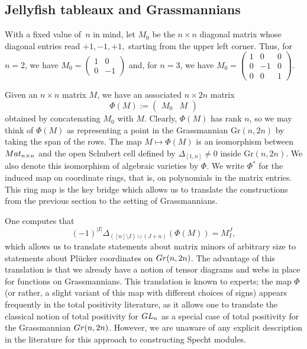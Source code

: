 \documentclass[10pt]{amsart}
\theoremstyle{definition}
\theoremstyle{plain}
\theoremstyle{plain}
\theoremstyle{definition}
\theoremstyle{remark}
\theoremstyle{plain}
\theoremstyle{plain}
\theoremstyle{plain}
\numberwithin{equation}{section}
\newcommand{\Gr}{\mathrm{Gr}}
\begin{document}
\subsection{Jellyfish tableaux and Grassmannians}\label{sec:jellyfish_on_Gr}
With a fixed value of~$n$ in mind, let 
$M_0$ be the $n \times n$ diagonal matrix whose diagonal entries read $+1,-1,+1,$ starting from the upper left corner. Thus, for $n=2$, we have $M_0 = \begin{pmatrix}
1 & 0 \\ 0 & -1
\end{pmatrix}$
and, for $n=3$, we have
$M_0 = \begin{pmatrix}
1 &  0 & 0 \\ 0 & -1 & 0 \\ 0 & 0 & 1
\end{pmatrix}$.

 
Given an $n \times n$ matrix $M$, we have an associated $n \times 2n $ matrix 
\begin{equation}\label{eq:Phi}
\Phi(M) := \begin{pmatrix}
M_0 & {M} 
\end{pmatrix}
\end{equation}
obtained by concatenating $M_0$ with $M$.
Clearly, $\Phi(M)$ has rank $n$, so we may think of $\Phi(M)$ as representing a point in the Grassmannian $\Gr(n,2n)$ by taking the span of the rows. The map $M \mapsto \Phi(M)$ is an isomorphism between ${\rm Mat}_{n \times n}$ and the open Schubert cell defined by $\Delta_{[1,n]} \neq 0$ inside 
$\Gr(n,2n)$. We also denote this isomorphism of algebraic varieties by $\Phi$. We write $\Phi^*$ for the induced map on coordinate rings, that is, on polynomials in the matrix entries. This ring map is the key bridge which allows us to translate the constructions from the previous section to the setting of Grassmannians.

 
One computes that
\begin{equation}\label{eq:PlutoMinor}
(-1)^{|I|}\Delta_{([n]\setminus I) \cup (J+n)}(\Phi(M)) = M_I^J,
\end{equation}
which allows us to translate statements about matrix minors of arbitrary size to statements about Pl\"ucker coordinates on ${\rm Gr}(n,2n)$. The advantage of this translation is that we already have a notion of tensor diagrams and webs in place for functions on Grassmannians. This translation is known to experts; the map $\Phi$ (or rather, a slight variant of this map with different choices of signs) appears frequently in the total positivity literature, as it allows one to translate the classical notion of total positivity for ${\rm GL}_n$ as a special case of total positivity for the Grassmannian ${\rm Gr}(n,2n)$. However, we are unaware of any explicit description in the literature for this approach to constructing Specht modules.
\end{document}
